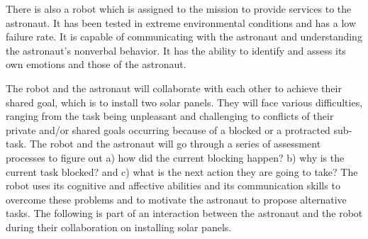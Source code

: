 \documentclass[12pt]{report}
\begin{document}
There is also a robot which is assigned to the mission to provide services to
the astronaut. It has been tested in extreme environmental conditions and has
a low failure rate. It is capable of communicating with the astronaut and
understanding the astronaut's nonverbal behavior. It has the ability to identify
and assess its own emotions and those of the astronaut.

The robot and the astronaut will collaborate with each other to achieve their
shared goal, which is to install two solar panels. They will face various
difficulties, ranging from the task being unpleasant and challenging to
conflicts of their private and/or shared goals occurring because of a blocked or
a protracted sub-task. The robot and the astronaut will go through a series of
assessment processes to figure out a) how did the current blocking happen? b)
why is the current task blocked? and c) what is the next action they are going
to take? The robot uses its cognitive and affective abilities and its
communication skills to overcome these problems and to motivate the astronaut to
propose alternative tasks. The following is part of an interaction between the
astronaut and the robot during their collaboration on installing solar panels.
\end{document}
